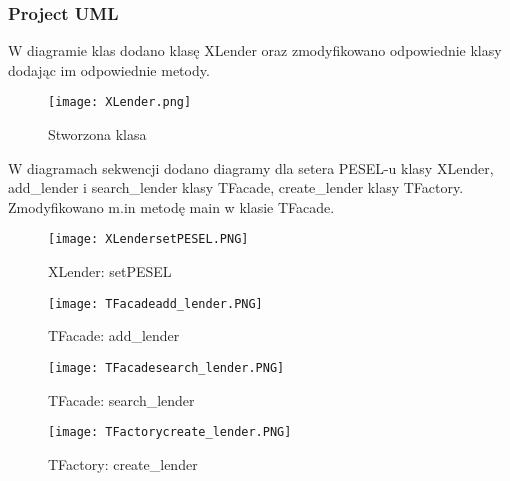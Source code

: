 \documentclass{article}
\begin{document}
\subsubsection{Project UML}
W diagramie klas dodano klasę XLender oraz zmodyfikowano odpowiednie klasy dodając im odpowiednie metody.
\begin{figure}[!ht]
\centering
	\texttt{[image: XLender.png]}
	\caption{Stworzona klasa}
	\label{fig:obrazek 2}
\end{figure}
\newpage
W diagramach sekwencji dodano diagramy dla setera PESEL-u klasy XLender, add\_lender i search\_lender klasy TFacade, create\_lender klasy TFactory. Zmodyfikowano m.in metodę main w klasie TFacade.
\begin{figure}[!ht]
\centering
	\texttt{[image: XLendersetPESEL.PNG]}
	\caption{XLender: setPESEL}
	\label{fig:obrazek 3}
\end{figure}
\begin{figure}[!ht]
\centering
	\texttt{[image: TFacadeadd\_lender.PNG]}
	\caption{TFacade: add\_lender}
	\label{fig:obrazek 4}
\end{figure}
\begin{figure}[!ht]
\centering
	\texttt{[image: TFacadesearch\_lender.PNG]}
	\caption{TFacade: search\_lender}
	\label{fig:obrazek 5}
	\end{figure}
	\begin{figure}[!ht]
\centering
	\texttt{[image: TFactorycreate\_lender.PNG]}
	\caption{TFactory: create\_lender}
	\label{fig:obrazek 6}
\end{figure}
\newpage
\end{document}
